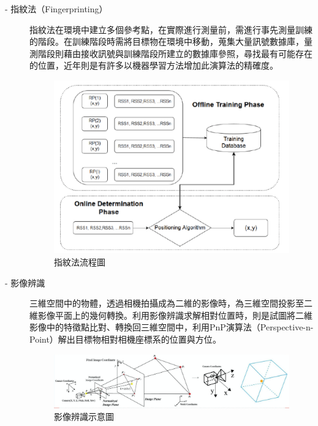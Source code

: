 \begin{description}
        \item[- 指紋法（Fingerprinting）] \hfill 
        
        \qquad
        指紋法在環境中建立多個參考點，在實際進行測量前，需進行事先測量訓練的階段。在訓練階段時需將目標物在環境中移動，蒐集大量訊號數據庫，量測階段則藉由接收訊號與訓練階段所建立的數據庫參照，尋找最有可能存在的位置\cite{survey_light2020}，近年則是有許多以機器學習方法增加此演算法的精確度。
        \begin{figure}[h]
            \centering
            \includegraphics[width=13cm]{ch2pic/fingerprinting.png}
            \caption{指紋法流程圖\cite{pic:fingerprinting}}
            \label{pic:fingerprinting}
        \end{figure}
        
        \item[- 影像辨識]\hfill 
        
        \qquad
        三維空間中的物體，透過相機拍攝成為二維的影像時，為三維空間投影至二維影像平面上的幾何轉換。利用影像辨識求解相對位置時，則是試圖將二維影像中的特徵點比對、轉換回三維空間中，利用PnP演算法（Perspective-n-Point）解出目標物相對相機座標系的位置與方位\cite{pic:image_processing}。
        
        \begin{figure}[h]
            \centering
            \includegraphics[width=15cm]{ch2pic/image_processing.png}
            \caption{影像辨識示意圖\cite{pic:image_processing}}
            \label{pic:image_processing}
        \end{figure}
        

\end{description}
